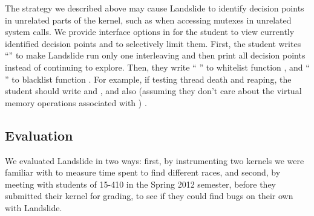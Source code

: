 The strategy we described above may cause Landslide to identify decision points in unrelated parts of the kernel, such as when accessing mutexes in unrelated system calls.
We provide interface options in  for the student to view currently identified decision points and to selectively limit them.
First, the student writes ``'' to make Landslide run only one interleaving and then print all decision points instead of continuing to explore.
Then, they write `` '' to whitelist function , and `` '' to blacklist function .
For example, if testing thread death and reaping, the student should write  and  , and also
(assuming they don't care about the virtual memory operations associated with )
 .

%

\subsection{Evaluation}

We evaluated Landslide in two ways: first, by instrumenting two kernels we were familiar with to measure time spent to find different races, and second, by meeting with students of 15-410 in the Spring 2012 semester, before they submitted their kernel for grading, to see if they could find bugs on their own with Landslide.

